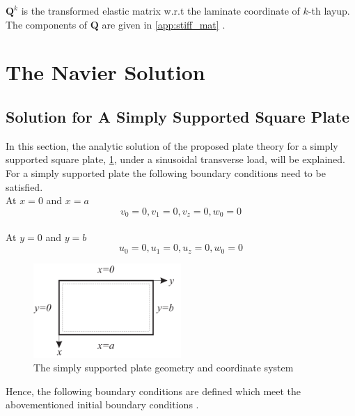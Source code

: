 \documentclass{article}
\begin{document}
$\bm{Q}^k$ is the transformed elastic matrix w.r.t the laminate coordinate of $k$-th layup. The components of $\bm{Q}$ are given in \cref{app:stiff_mat} \cite{Kant2002}.


\section{The Navier Solution}
\subsection{Solution for A Simply Supported Square Plate}

In this section, the analytic solution of the proposed plate theory for a simply supported square plate, \cref{fig:ss}, under a sinusoidal transverse load, will be explained. For a simply supported plate the following boundary conditions need to be satisfied. \\ 

At $x=0$ and $x=a$
\begin{equation*}
    v_0 = 0, v_1 = 0, v_z = 0, w_0 = 0
\end{equation*}
\\

At $y=0$ and $y=b$
\begin{equation*}
    u_0 = 0, u_1 = 0, u_z = 0, w_0 = 0
\end{equation*}

\begin{figure}[!]
    \centering
    \includegraphics[width = 0.5\textwidth]{figures/ss_plate.pdf}
    \caption{The simply supported plate geometry and coordinate system}
    \label{fig:ss}
\end{figure}

Hence, the following boundary conditions are defined which meet the abovementioned initial boundary conditions \cite{Kant2002}.
\end{document}

